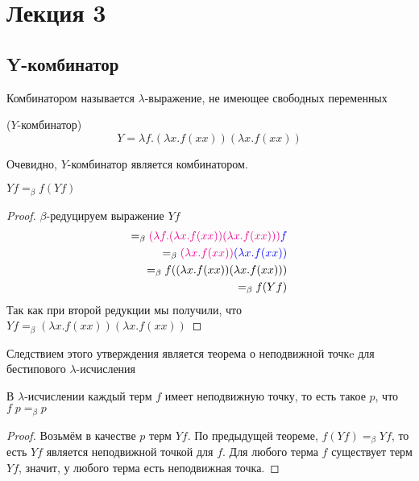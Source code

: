 \section{Лекция 3}

\subsection{Y-комбинатор}

\begin{definition}
	Комбинатором называется $\lambda$-выражение, не имеющее свободных переменных
\end{definition}

\begin{definition}($Y$-комбинатор)
	\[
	Y = \lambda f . (\lambda x . f (x x)) (\lambda x . f (x x))
	\]
\end{definition}

Очевидно, $Y$-комбинатор является комбинатором.

\begin{theorem}
	$Y f =_{\beta} f (Y f)$
	
	\begin{proof}
		$\beta$-редуцируем выражение $Y f$
		\begin{align*}
			 =_{\beta} \textcolor{magenta}{(\lambda f . (\lambda x . f (x x)) (\lambda x . f (x x)))}\textcolor{blue}{f} \\ =_{\beta} \textcolor{magenta}{(\lambda x . f (x x))} \textcolor{blue}{(\lambda x . f (x x))} \\ =_{\beta} f ((\lambda x . f (x x))(\lambda x . f (x x))) \\ =_{\beta} f(Y f)
		\end{align*}
		Так как при второй редукции мы получили, что $Y f =_{\beta} (\lambda x . f (x x))(\lambda x . f (x x))$
	\end{proof}	
\end{theorem}

Следствием этого утверждения является теорема о неподвижной точкe для бестипового $\lambda$-исчисления

\begin{theorem}
	В $\lambda$-исчислении каждый терм $f$ имеет неподвижную точку, то есть такое $p$, что $f \; p =_{\beta} p$
	
	\begin{proof}
		Возьмём в качестве $p$ терм $Y f$. По предыдущей теореме, $f(Y f) =_{\beta} Y f$, то есть $Y f$ является неподвижной точкой для $f$. Для любого терма $f$ существует терм $Y f$, значит, у любого терма есть неподвижная точка.
	\end{proof}
\end{theorem}

